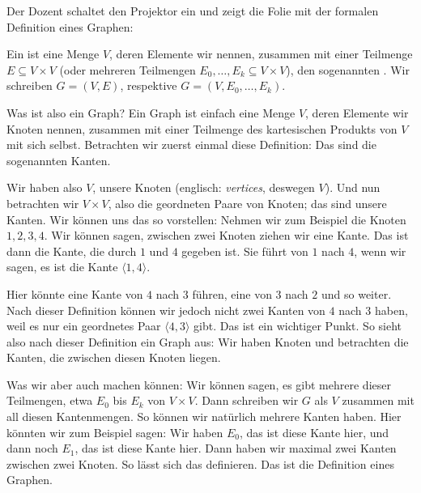 \begin{meta-note}
Der Dozent schaltet den Projektor ein und zeigt die Folie \textbf{} mit der formalen Definition eines Graphen:
\begin{definition}[Graph]
Ein  ist eine Menge $V$, deren Elemente wir  nennen, zusammen mit einer Teilmenge $E \subseteq V \times V$ (oder mehreren Teilmengen $E_0, \dots, E_k \subseteq V \times V$), den sogenannten . Wir schreiben $G = (V, E)$, respektive $G = (V, E_0, \dots, E_k)$.
\end{definition}
\end{meta-note}

\begin{spoken-clean}[00:13:36 - 00:16:52]
Was ist also ein Graph? Ein Graph ist einfach eine Menge $V$, deren Elemente wir Knoten nennen, zusammen mit einer Teilmenge des kartesischen Produkts von $V$ mit sich selbst. Betrachten wir zuerst einmal diese Definition: Das sind die sogenannten Kanten.

Wir haben also $V$, unsere Knoten (englisch: \emph{vertices}, deswegen $V$). Und nun betrachten wir $V \times V$, also die geordneten Paare von Knoten; das sind unsere Kanten. Wir können uns das so vorstellen: Nehmen wir zum Beispiel die Knoten $1, 2, 3, 4$. Wir können sagen, zwischen zwei Knoten ziehen wir eine Kante. Das ist dann die Kante, die durch $1$ und $4$ gegeben ist. Sie führt von $1$ nach $4$, wenn wir sagen, es ist die Kante $\langle 1, 4 \rangle$.

Hier könnte eine Kante von $4$ nach $3$ führen, eine von $3$ nach $2$ und so weiter. Nach dieser Definition können wir jedoch nicht zwei Kanten von $4$ nach $3$ haben, weil es nur ein geordnetes Paar $\langle 4, 3 \rangle$ gibt. Das ist ein wichtiger Punkt. So sieht also nach dieser Definition ein Graph aus: Wir haben Knoten und betrachten die Kanten, die zwischen diesen Knoten liegen.

Was wir aber auch machen können: Wir können sagen, es gibt mehrere dieser Teilmengen, etwa $E_0$ bis $E_k$ von $V \times V$. Dann schreiben wir $G$ als $V$ zusammen mit all diesen Kantenmengen. So können wir natürlich mehrere Kanten haben. Hier könnten wir zum Beispiel sagen: Wir haben $E_0$, das ist diese Kante hier, und dann noch $E_1$, das ist diese Kante hier. Dann haben wir maximal zwei Kanten zwischen zwei Knoten. So lässt sich das definieren. Das ist die Definition eines Graphen.
\end{spoken-clean}


